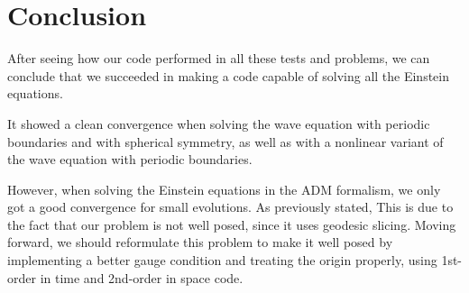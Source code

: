 \vspace{-0.5cm}
\section{Conclusion}
\vspace{-0.1cm}

After seeing how our code performed in all these tests and problems, we can conclude that we succeeded in making a code capable of solving all the Einstein equations. 

It showed a clean convergence when solving the wave equation with periodic boundaries and with spherical symmetry, as well as with a nonlinear variant of the wave equation with periodic boundaries. 

However, when solving the Einstein equations in the ADM formalism, we only got a good convergence for small evolutions. As previously stated, This is due to the fact that our problem is not well posed, since it uses geodesic slicing. Moving forward, we should reformulate this problem to make it well posed by implementing a better gauge condition and treating the origin properly, using 1st-order in time and 2nd-order in space code.

